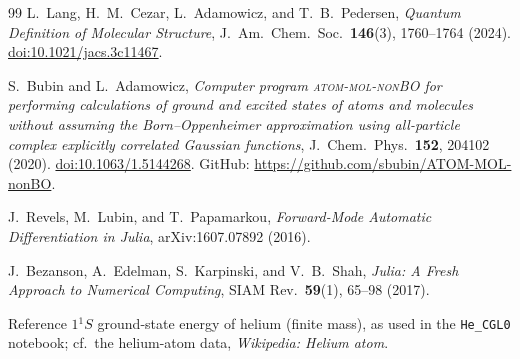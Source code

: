 \documentclass[11pt]{article}
\begin{document}
\begin{thebibliography}{99}
L.\ Lang, H.\ M.\ Cezar, L.\ Adamowicz, and T.\ B.\ Pedersen, \emph{Quantum
Definition of Molecular Structure}, J.\ Am.\ Chem.\ Soc.\ \textbf{146}(3),
1760--1764 (2024). \href{https://doi.org/10.1021/jacs.3c11467}{doi:10.1021/jacs.3c11467}.

S.\ Bubin and L.\ Adamowicz, \emph{Computer program \textup{\textsc{atom-mol-nonBO}}
for performing calculations of ground and excited states of atoms and molecules
without assuming the Born--Oppenheimer approximation using all-particle complex
explicitly correlated Gaussian functions}, J.\ Chem.\ Phys.\ \textbf{152},
204102 (2020). \href{https://doi.org/10.1063/1.5144268}{doi:10.1063/1.5144268}.
GitHub: \url{https://github.com/sbubin/ATOM-MOL-nonBO}.

J.\ Revels, M.\ Lubin, and T.\ Papamarkou, \emph{Forward-Mode Automatic
Differentiation in Julia}, arXiv:1607.07892 (2016).

J.\ Bezanson, A.\ Edelman, S.\ Karpinski, and V.\ B.\ Shah, \emph{Julia: A Fresh
Approach to Numerical Computing}, SIAM Rev.\ \textbf{59}(1), 65--98 (2017).

Reference $1{}^1S$ ground-state energy of helium (finite mass), as used in the
\texttt{He\_CGL0} notebook; cf.\ the helium-atom data, \emph{Wikipedia: Helium atom}.

\end{thebibliography}
\end{document}
